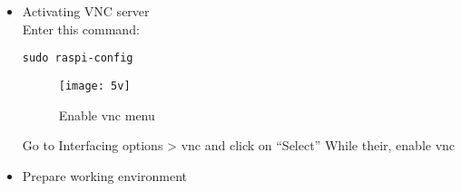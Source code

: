 \begin{itemize}
\begin{table}[h]
\centering
{}

\label{tab:time}
\end{table}

\FloatBarrier

\item{Activating VNC server}\\
Enter this command:
\begin{lstlisting}
sudo raspi-config
\end{lstlisting}
\FloatBarrier
\begin{figure}[h]

       \centering

        \texttt{[image: 5v]}
   
        \caption{Enable vnc menu}
        \label{fig:Enable vnc menu}

    \end{figure}
\FloatBarrier
Go to Interfacing options > vnc and click on “Select” While their, enable vnc
\item{Prepare working environment}\\
\FloatBarrier
\begin{figure}[h]


\end{figure}
\end{itemize}
